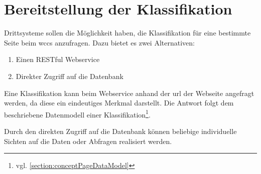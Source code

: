\section{Bereitstellung der Klassifikation}
    Drittsysteme sollen die Möglichkeit haben,
    die Klassifikation für eine bestimmte Seite beim \gls{wccs} anzufragen.
    Dazu bietet es zwei Alternativen:

    \begin{enumerate}
        \item Einen RESTful Webservice
        \item Direkter Zugriff auf die Datenbank
    \end{enumerate}

    Eine Klassifikation kann beim Webservice anhand der \gls{url} der Webseite angefragt werden,
    da diese ein eindeutiges Merkmal darstellt.
    Die Antwort folgt dem beschriebene Datenmodell einer
    Klassifikation\footnote{vgl. \ref{section:conceptPageDataModel}}.

    Durch den direkten Zugriff auf die Datenbank können
    beliebige individuelle Sichten auf die Daten oder Abfragen realisiert werden.
